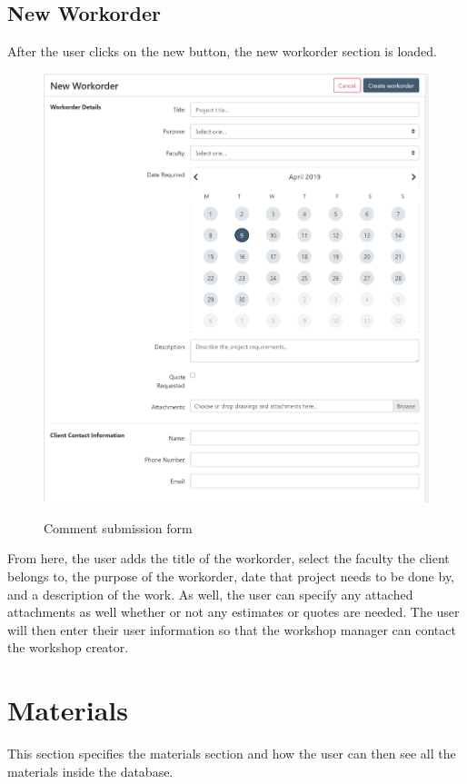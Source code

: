 {{\subsection{New Workorder}
After the user clicks on the new button, the new workorder section is loaded. 
\begin{figure}[H]
	\centering
	\includegraphics[width=5in]{new-workorder.png}\\
	\caption{Comment submission form}
	\label{fig:tobias}
\end{figure}

From here, the user adds the title of the workorder, select the faculty the client belongs to, the purpose of the workorder, date that project needs to be done by, and a description of the work. As well, the user can specify any attached attachments as well whether or not any estimates or quotes are needed. The user will then enter their user information so that the workshop manager can contact the workshop creator.

\newpage
\section{Materials}
This section specifies the materials section and how the user can then see all the materials inside the database.

}}
